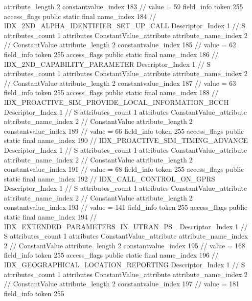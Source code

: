 {{{{{{{					attribute_length	2
					constantvalue_index	183		// value = 59
				}
				}
			}
			field_info {
				token	255
				access_flags	public static final
				name_index	184		// IDX_2ND_ALPHA_IDENTIFIER_SET_UP_CALL
				Descriptor_Index	1		// S
				attributes_count	1
				attributes {
				ConstantValue_attribute {
					attribute_name_index	2		// ConstantValue
					attribute_length	2
					constantvalue_index	185		// value = 62
				}
				}
			}
			field_info {
				token	255
				access_flags	public static final
				name_index	186		// IDX_2ND_CAPABILITY_PARAMETER
				Descriptor_Index	1		// S
				attributes_count	1
				attributes {
				ConstantValue_attribute {
					attribute_name_index	2		// ConstantValue
					attribute_length	2
					constantvalue_index	187		// value = 63
				}
				}
			}
			field_info {
				token	255
				access_flags	public static final
				name_index	188		// IDX_PROACTIVE_SIM_PROVIDE_LOCAL_INFORMATION_BCCH
				Descriptor_Index	1		// S
				attributes_count	1
				attributes {
				ConstantValue_attribute {
					attribute_name_index	2		// ConstantValue
					attribute_length	2
					constantvalue_index	189		// value = 66
				}
				}
			}
			field_info {
				token	255
				access_flags	public static final
				name_index	190		// IDX_PROACTIVE_SIM_TIMING_ADVANCE
				Descriptor_Index	1		// S
				attributes_count	1
				attributes {
				ConstantValue_attribute {
					attribute_name_index	2		// ConstantValue
					attribute_length	2
					constantvalue_index	191		// value = 68
				}
				}
			}
			field_info {
				token	255
				access_flags	public static final
				name_index	192		// IDX_CALL_CONTROL_ON_GPRS
				Descriptor_Index	1		// S
				attributes_count	1
				attributes {
				ConstantValue_attribute {
					attribute_name_index	2		// ConstantValue
					attribute_length	2
					constantvalue_index	193		// value = 141
				}
				}
			}
			field_info {
				token	255
				access_flags	public static final
				name_index	194		// IDX_EXTENDED_PARAMETERS_IN_UTRAN_PS_
				Descriptor_Index	1		// S
				attributes_count	1
				attributes {
				ConstantValue_attribute {
					attribute_name_index	2		// ConstantValue
					attribute_length	2
					constantvalue_index	195		// value = 168
				}
				}
			}
			field_info {
				token	255
				access_flags	public static final
				name_index	196		// IDX_GEOGRAPHICAL_LOCATION_REPORTING
				Descriptor_Index	1		// S
				attributes_count	1
				attributes {
				ConstantValue_attribute {
					attribute_name_index	2		// ConstantValue
					attribute_length	2
					constantvalue_index	197		// value = 181
				}
				}
			}
			field_info {
				token	255
}}}}}
